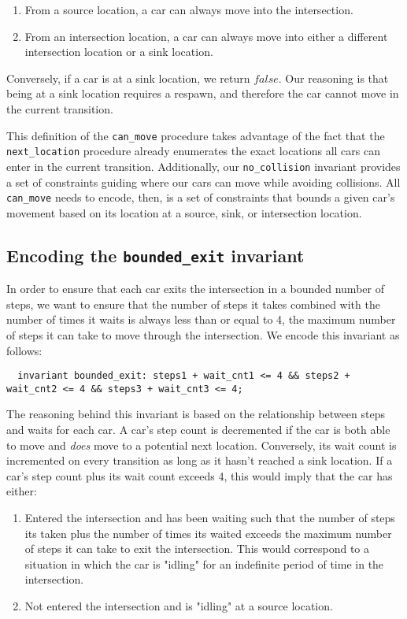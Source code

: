 \documentclass{article}
\newcommand{\code}[1]{\texttt{#1}}
\begin{document}
\begin{enumerate}
  \item From a source location, a car can always move into the intersection.
  \item From an intersection location, a car can always move into either a different intersection location or a sink location.
\end{enumerate}

Conversely, if a car is at a sink location, we return $false$. Our reasoning is that being at a sink location requires a respawn, and therefore the car cannot move in the current transition.

This definition of the \code{can\_move} procedure takes advantage of the fact that the \code{next\_location} procedure already enumerates the exact locations all cars can enter in the current transition. Additionally, our \code{no\_collision} invariant provides a set of constraints guiding where our cars can move while avoiding collisions. All \code{can\_move} needs to encode, then, is a set of constraints that bounds a given car's movement based on its location at a source, sink, or intersection location.

\subsection{Encoding the \code{bounded\_exit} invariant}

In order to ensure that each car exits the intersection in a bounded number of steps, we want to ensure that the number of steps it takes combined with the number of times it waits is always less than or equal to 4, the maximum number of steps it can take to move through the intersection. We encode this invariant as follows:

\begin{lstlisting}
  invariant bounded_exit: steps1 + wait_cnt1 <= 4 && steps2 + wait_cnt2 <= 4 && steps3 + wait_cnt3 <= 4;
\end{lstlisting}

The reasoning behind this invariant is based on the relationship between steps and waits for each car. A car's step count is decremented if the car is both able to move and \emph{does} move to a potential next location. Conversely, its wait count is incremented on every transition as long as it hasn't reached a sink location. If a car's step count plus its wait count exceeds 4, this would imply that the car has either:

\begin{enumerate}
  \item Entered the intersection and has been waiting such that the number of steps its taken plus the number of times its waited exceeds the maximum number of steps it can take to exit the intersection. This would correspond to a situation in which the car is "idling" for an indefinite period of time in the intersection.
  \item Not entered the intersection and is "idling" at a source location.
\end{enumerate}
\end{document}
